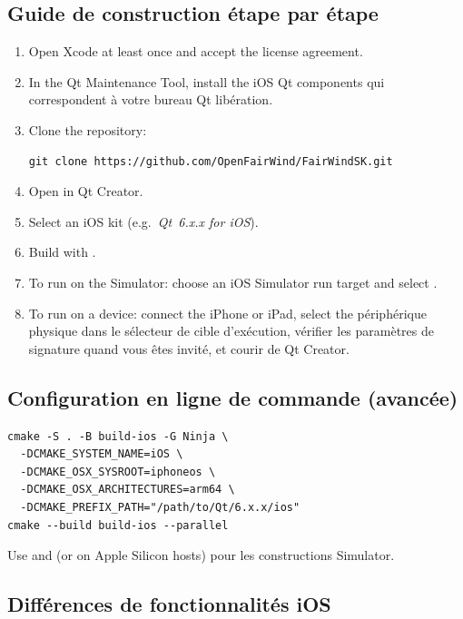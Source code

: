 \subsection{Guide de construction étape par étape}

\begin{enumerate}
  \item Open Xcode at least once and accept the license agreement.
  \item In the Qt Maintenance Tool, install the iOS Qt components
qui correspondent à votre bureau Qt libération.
  \item Clone the repository:
\begin{lstlisting}
git clone https://github.com/OpenFairWind/FairWindSK.git
\end{lstlisting}
  \item Open  in Qt Creator.
  \item Select an iOS kit (e.g.\ \textit{Qt~6.x.x for iOS}).
  \item Build with .
  \item To run on the Simulator: choose an iOS Simulator run target
        and select .
  \item To run on a device: connect the iPhone or iPad, select the
périphérique physique dans le sélecteur de cible d'exécution, vérifier les paramètres de signature
quand vous êtes invité, et courir de Qt Creator.
\end{enumerate}

\subsection{Configuration en ligne de commande (avancée)}

\begin{lstlisting}
cmake -S . -B build-ios -G Ninja \
  -DCMAKE_SYSTEM_NAME=iOS \
  -DCMAKE_OSX_SYSROOT=iphoneos \
  -DCMAKE_OSX_ARCHITECTURES=arm64 \
  -DCMAKE_PREFIX_PATH="/path/to/Qt/6.x.x/ios"
cmake --build build-ios --parallel
\end{lstlisting}

Use \code{iphonesimulator} and \code{x86\_64} (or  on
Apple Silicon hosts) pour les constructions Simulator.

\subsection{Différences de fonctionnalités iOS}

